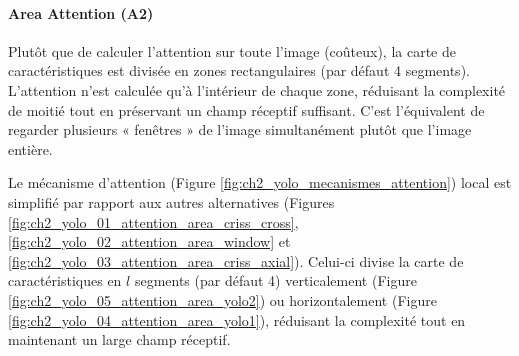 \paragraph{Area Attention (A2)}
Plutôt que de calculer l'attention sur toute l'image (coûteux), la carte de caractéristiques est divisée en zones rectangulaires (par défaut 4 segments). L'attention n'est calculée qu'à l'intérieur de chaque zone, réduisant la complexité de moitié tout en préservant un champ réceptif suffisant. C'est l'équivalent de regarder plusieurs « fenêtres » de l'image simultanément plutôt que l'image entière.

Le mécanisme d'attention (Figure \ref{fig:ch2_yolo_mecanismes_attention}) local est simplifié par rapport aux autres alternatives (Figures \ref{fig:ch2_yolo_01_attention_area_criss_cross}, \ref{fig:ch2_yolo_02_attention_area_window} et \ref{fig:ch2_yolo_03_attention_area_criss_axial}). Celui-ci divise la carte de caractéristiques en $l$ segments (par défaut 4) verticalement (Figure \ref{fig:ch2_yolo_05_attention_area_yolo2}) ou horizontalement (Figure \ref{fig:ch2_yolo_04_attention_area_yolo1}), réduisant la complexité tout en maintenant un large champ réceptif.

